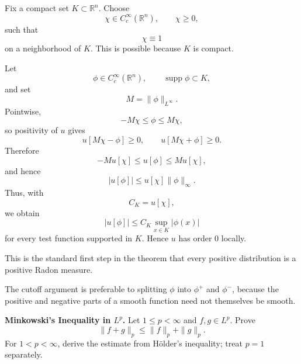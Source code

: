 \begin{solution}
Fix a compact set \(K\subset\mathbb R^n\). Choose
\[
\chi\in C_c^\infty(\mathbb R^n),
\qquad
\chi\ge0,
\]
such that
\[
\chi\equiv1
\]
on a neighborhood of \(K\). This is possible because \(K\) is compact.

Let
\[
\phi\in C_c^\infty(\mathbb R^n),
\qquad
\operatorname{supp}\phi\subset K,
\]
and set
\[
M=\|\phi\|_{L^\infty}.
\]
Pointwise,
\[
-M\chi\le\phi\le M\chi,
\]
so positivity of \(u\) gives
\[
u[M\chi-\phi]\ge0,
\qquad
u[M\chi+\phi]\ge0.
\]
Therefore
\[
-Mu[\chi]\le u[\phi]\le Mu[\chi],
\]
and hence
\[
|u[\phi]|
\le
u[\chi]\|\phi\|_\infty.
\]
Thus, with
\[
C_K=u[\chi],
\]
we obtain
\[
\boxed{
|u[\phi]|
\le
C_K\sup_{x\in K}|\phi(x)|
}
\]
for every test function supported in \(K\). Hence \(u\) has order \(0\) locally.

This is the standard first step in the theorem that every positive distribution is a positive Radon measure.

The cutoff argument is preferable to splitting \(\phi\) into \(\phi^+\) and \(\phi^-\), because the positive and negative parts of a smooth function need not themselves be smooth.
\end{solution}


\begin{problem}[CP-II-0138]
\label{prob:cp-ii-0138}
\textbf{Minkowski's Inequality in \(L^p\).}
Let \(1\le p<\infty\) and \(f,g\in L^p\). Prove
\[
\|f+g\|_p\le\|f\|_p+\|g\|_p.
\]
For \(1<p<\infty\), derive the estimate from Hölder's inequality; treat \(p=1\) separately.
\end{problem}

